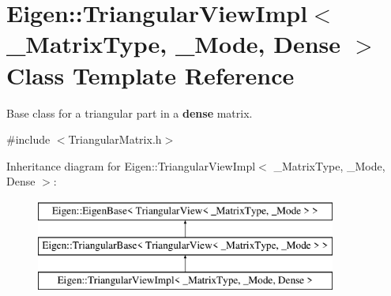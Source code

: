 \hypertarget{class_eigen_1_1_triangular_view_impl_3_01___matrix_type_00_01___mode_00_01_dense_01_4}{}\section{Eigen\+::Triangular\+View\+Impl$<$ \+\_\+\+Matrix\+Type, \+\_\+\+Mode, Dense $>$ Class Template Reference}
\label{class_eigen_1_1_triangular_view_impl_3_01___matrix_type_00_01___mode_00_01_dense_01_4}


Base class for a triangular part in a {\bfseries{dense}} matrix.  




{\ttfamily \#include $<$Triangular\+Matrix.\+h$>$}

Inheritance diagram for Eigen\+::Triangular\+View\+Impl$<$ \+\_\+\+Matrix\+Type, \+\_\+\+Mode, Dense $>$\+:\begin{figure}[H]
\begin{center}
\leavevmode
\includegraphics[height=3.000000cm]{class_eigen_1_1_triangular_view_impl_3_01___matrix_type_00_01___mode_00_01_dense_01_4}
\end{center}
\end{figure}
